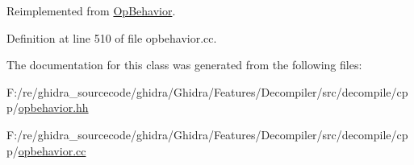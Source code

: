Reimplemented from \mbox{\hyperlink{class_op_behavior_aeeed3af7aa35264b31a1f182884214a9}{Op\+Behavior}}.



Definition at line 510 of file opbehavior.\+cc.



The documentation for this class was generated from the following files\+:\begin{DoxyCompactItemize}
\item 
F\+:/re/ghidra\+\_\+sourcecode/ghidra/\+Ghidra/\+Features/\+Decompiler/src/decompile/cpp/\mbox{\hyperlink{opbehavior_8hh}{opbehavior.\+hh}}\item 
F\+:/re/ghidra\+\_\+sourcecode/ghidra/\+Ghidra/\+Features/\+Decompiler/src/decompile/cpp/\mbox{\hyperlink{opbehavior_8cc}{opbehavior.\+cc}}\end{DoxyCompactItemize}
